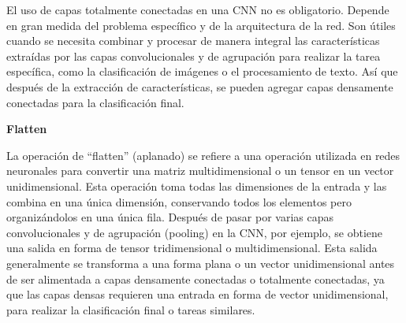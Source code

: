 El uso de capas totalmente conectadas en una CNN no es obligatorio. Depende en gran medida del problema específico y de la arquitectura de la red. Son útiles cuando se necesita combinar y procesar de manera integral las características extraídas por las capas convolucionales y de agrupación para realizar la tarea específica, como la clasificación de imágenes o el procesamiento de texto. Así que después de la extracción de características, se pueden agregar capas densamente conectadas para la clasificación final.

\textbf{Flatten}

La operación de ``flatten'' (aplanado) se refiere a una operación utilizada en redes neuronales para convertir una matriz multidimensional o un tensor en un vector unidimensional. Esta operación toma todas las dimensiones de la entrada y las combina en una única dimensión, conservando todos los elementos pero organizándolos en una única fila.
Después de pasar por varias capas convolucionales y de agrupación (pooling) en la CNN, por ejemplo, se obtiene una salida en forma de tensor tridimensional o multidimensional. Esta salida generalmente se transforma a una forma plana o un vector unidimensional antes de ser alimentada a capas densamente conectadas o totalmente conectadas, ya que las capas densas requieren una entrada en forma de vector unidimensional, para realizar la clasificación final o tareas similares.

